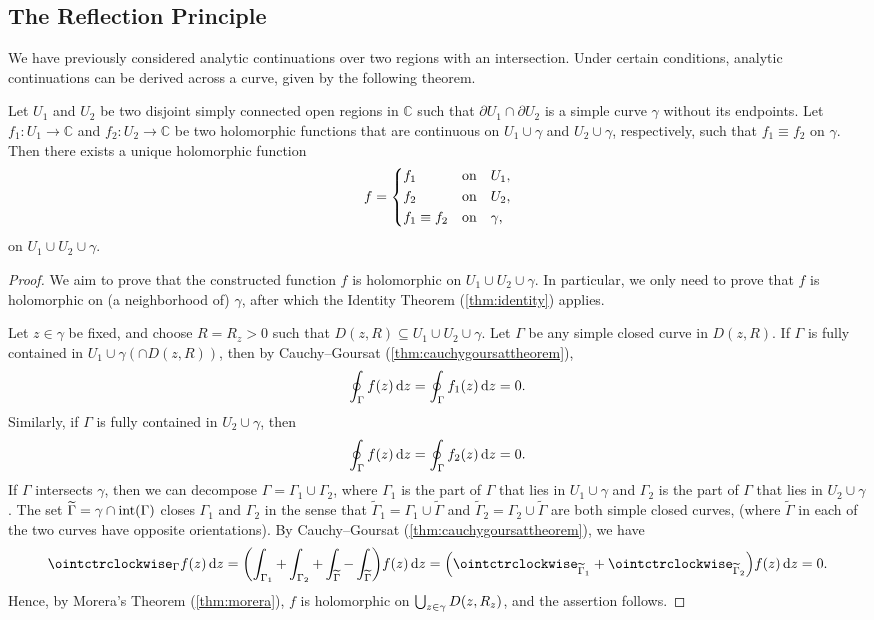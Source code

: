 \subsection{The Reflection Principle}
We have previously considered analytic continuations over two regions with an intersection. Under certain conditions, analytic continuations can be derived across a curve, given by the following theorem.
\begin{theorem}\label{thm:painleve}
    Let \(U_1\) and \(U_2\) be two disjoint simply connected open regions in \(\mathbb{C}\) such that \(\partial U_1\cap\partial U_2\) is a simple curve \(\gamma\) without its endpoints. Let \(f_1:U_1\to\mathbb{C}\) and \(f_2:U_2\to\mathbb{C}\) be two holomorphic functions that are continuous on \(U_1\cup\gamma\) and \(U_2\cup\gamma\), respectively, such that \(f_1\equiv f_2\) on \(\gamma\). Then there exists a unique holomorphic function \[f=
        \begin{dcases}
            f_1           & \qq*{on}U_1,    \\
            f_2           & \qq*{on}U_2,    \\
            f_1\equiv f_2 & \qq*{on}\gamma,
        \end{dcases}\] on \(U_1\cup U_2\cup\gamma\).
\end{theorem}
\begin{proof}
    We aim to prove that the constructed function \(f\) is holomorphic on \(U_1\cup U_2\cup\gamma\). In particular, we only need to prove that \(f\) is holomorphic on (a neighborhood of) \(\gamma\), after which the Identity Theorem (\cref{thm:identity}) applies.

    Let \(z\in\gamma\) be fixed, and choose \(R=R_z>0\) such that \(D(z,R)\subseteq U_1\cup U_2\cup\gamma\). Let \(\Gamma\) be any simple closed curve in \(D(z,R)\). If \(\Gamma\) is fully contained in \(U_1\cup\gamma(\cap D(z,R))\), then by Cauchy--Goursat (\cref{thm:cauchygoursattheorem}), \[\oint_{\Gamma}f(z)\dd{z}=\oint_{\Gamma}f_1(z)\dd{z}=0.\]
    Similarly, if \(\Gamma\) is fully contained in \(U_2\cup\gamma\), then \[\oint_{\Gamma}f(z)\dd{z}=\oint_{\Gamma}f_2(z)\dd{z}=0.\]
    If \(\Gamma\) intersects \(\gamma\), then we can decompose \(\Gamma=\Gamma_1\cup\Gamma_2\), where \(\Gamma_1\) is the part of \(\Gamma\) that lies in \(U_1\cup\gamma\) and \(\Gamma_2\) is the part of \(\Gamma\) that lies in \(U_2\cup\gamma\). The set \(\widetilde{\Gamma}=\gamma\cap\mathrm{int}\qty(\Gamma)\) closes \(\Gamma_1\) and \(\Gamma_2\) in the sense that \(\widetilde{\Gamma}_1=\Gamma_1\cup\widetilde{\Gamma}\) and \(\widetilde{\Gamma}_2=\Gamma_2\cup\widetilde{\Gamma}\) are both simple closed curves, (where \(\widetilde{\Gamma}\) in each of the two curves have opposite orientations). By Cauchy--Goursat (\cref{thm:cauchygoursattheorem}), we have \[\ointctrclockwise_\Gamma f(z)\ddz=\qty(\int_{\Gamma_1}+\int_{\Gamma_2}+\int_{\widetilde{\Gamma}}-\int_{\widetilde{\Gamma}})f(z)\ddz=\qty(\ointctrclockwise_{\widetilde{\Gamma}_1}+\ointctrclockwise_{\widetilde{\Gamma}_2})f(z)\ddz=0.\] Hence, by Morera's Theorem (\cref{thm:morera}), \(f\) is holomorphic on \(\bigcup_{z\in\gamma}D\qty(z,R_z)\), and the assertion follows.
\end{proof}

